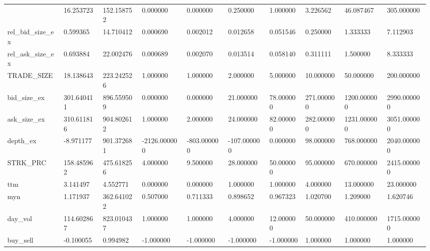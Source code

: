 \begin{table}
\begin{tabular}{llllllllll}
{bid_ask_size_ratio_ex & 16.253723 & 152.158752 & 0.000000 & 0.000000 & 0.250000 & 1.000000 & 3.226562 & 46.087467 & 305.000000 \\
rel_bid_size_ex & 0.599365 & 14.710412 & 0.000690 & 0.002012 & 0.012658 & 0.051546 & 0.250000 & 1.333333 & 7.112903 \\
rel_ask_size_ex & 0.693884 & 22.002476 & 0.000689 & 0.002070 & 0.013514 & 0.058140 & 0.311111 & 1.500000 & 8.333333 \\
TRADE_SIZE & 18.138643 & 223.242526 & 1.000000 & 1.000000 & 2.000000 & 5.000000 & 10.000000 & 50.000000 & 200.000000 \\
bid_size_ex & 301.640411 & 896.559509 & 0.000000 & 0.000000 & 21.000000 & 78.000000 & 271.000000 & 1200.000000 & 2990.000000 \\
ask_size_ex & 310.611816 & 904.802612 & 1.000000 & 2.000000 & 24.000000 & 82.000000 & 282.000000 & 1231.000000 & 3051.000000 \\
depth_ex & -8.971177 & 901.372681 & -2126.000000 & -803.000000 & -107.000000 & 0.000000 & 98.000000 & 768.000000 & 2040.000000 \\
STRK_PRC & 158.485962 & 475.618256 & 4.000000 & 9.500000 & 28.000000 & 50.000000 & 95.000000 & 670.000000 & 2415.000000 \\
ttm & 3.141497 & 4.552771 & 0.000000 & 0.000000 & 1.000000 & 1.000000 & 4.000000 & 13.000000 & 23.000000 \\
myn & 1.171937 & 362.641022 & 0.507000 & 0.711333 & 0.898652 & 0.967323 & 1.020700 & 1.209000 & 1.620746 \\
day_vol & 114.602867 & 823.010437 & 1.000000 & 1.000000 & 4.000000 & 12.000000 & 50.000000 & 410.000000 & 1715.000000 \\
buy_sell & -0.100055 & 0.994982 & -1.000000 & -1.000000 & -1.000000 & -1.000000 & 1.000000 & 1.000000 & 1.000000 \\
\bottomrule
\end{tabular}
\end{table}

